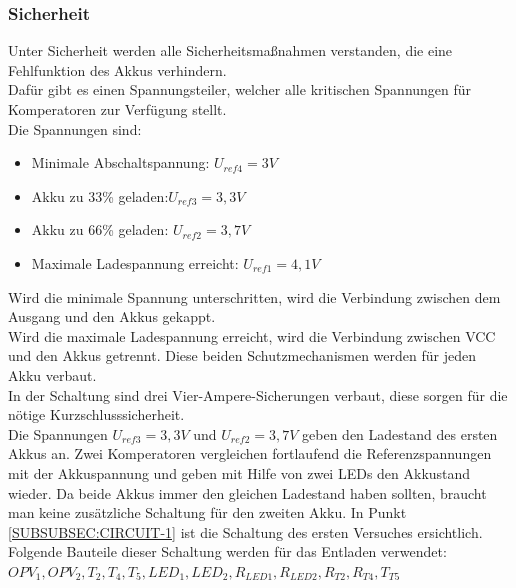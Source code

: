 \documentclass[12pt,a4paper]{article}
\begin{document}
\subsubsection{Sicherheit}
\label{SUBSUBSEC:Security1}

Unter Sicherheit werden alle Sicherheitsmaßnahmen verstanden, die eine Fehlfunktion des Akkus verhindern. \\
Dafür gibt es einen Spannungsteiler, welcher alle kritischen Spannungen für Komperatoren zur Verfügung stellt. \\
Die Spannungen sind: 
\begin{itemize}
	\item{Minimale Abschaltspannung: $U_{ref4} = 3 V$}
	\item{Akku zu 33\% geladen:$ U_{ref3}=3,3V$}
	\item{Akku zu 66\% geladen: $U_{ref2} = 3,7V$}
	\item{Maximale Ladespannung erreicht: $U_{ref1} = 4,1V$}
\end{itemize}
Wird die minimale Spannung unterschritten, wird die Verbindung zwischen dem Ausgang und den Akkus gekappt. \\
Wird die maximale Ladespannung erreicht, wird die Verbindung zwischen VCC und den Akkus getrennt. Diese beiden Schutzmechanismen werden für jeden Akku verbaut.\\
In der Schaltung sind drei Vier-Ampere-Sicherungen verbaut, diese sorgen für die nötige Kurzschlusssicherheit.  \\
Die Spannungen $ U_{ref3}=3,3V$ und $U_{ref2} = 3,7V$ geben den Ladestand des ersten Akkus an. Zwei Komperatoren vergleichen fortlaufend die Referenzspannungen mit der Akkuspannung und geben mit Hilfe von zwei LEDs den Akkustand wieder. Da beide Akkus immer den gleichen Ladestand haben sollten, braucht man keine zusätzliche Schaltung für den zweiten Akku.
In Punkt \ref{SUBSUBSEC:CIRCUIT-1} ist die Schaltung des ersten Versuches ersichtlich. Folgende Bauteile dieser Schaltung werden für das Entladen verwendet:\\ $OPV_1, OPV_2,T_2,T_4, T_5,LED_1,LED_2,R_{LED1},R_{LED2},R_{T2}, R_{T4},T_{T5}$ 
\newpage
\end{document}
